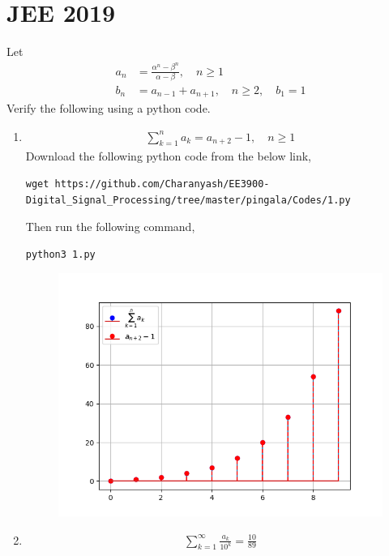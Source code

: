 \documentclass[journal,12pt,twocolumn]{IEEEtran}
\renewcommand\thesection{\arabic{section}}
\begin{document}
\section{JEE 2019}
Let 
\begin{align}
	a_n &= \frac{\alpha^{n}-\beta^{n}}{\alpha - \beta}, \quad n \ge 1
	\\
	b_n &= a_{n-1} + a_{n+1}, \quad n \ge 2, \quad b_1 =1
	\label{eq:10-orig-diff}
\end{align}
Verify the following using a python code.
\begin{enumerate}[label=\thesection.\arabic*
,ref=\thesection.\theenumi]
\item 
\begin{align}
	\sum_{k=1}^{n}a_k = a_{n+2}-1, \quad n \ge 1
\end{align}
\solution Download the following python code from the below link,
  \begin{lstlisting}
wget https://github.com/Charanyash/EE3900-Digital_Signal_Processing/tree/master/pingala/Codes/1.py
  \end{lstlisting}
Then run the following command,
  \begin{lstlisting}
python3 1.py
  \end{lstlisting}
  \begin{figure}[!ht]
 \includegraphics[width = \columnwidth]{Figs/1.1.png}
 \centering
 \caption{}
 \label{fig:1}
\end{figure}
 \item 
\begin{align}
	\sum_{k=1}^{\infty}\frac{a_k}{10^k} =\frac{10}{89}
\end{align}

\end{enumerate}
\end{document}

